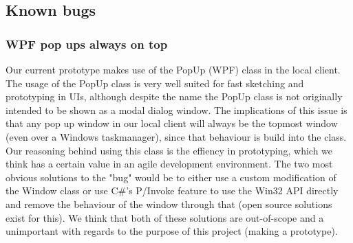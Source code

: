 \subsection{Known bugs}
\label{sec:bugs}

\subsubsection{WPF pop ups always on top}
Our current prototype makes use of the PopUp (WPF) class in the local client. The usage of the PopUp class is very well suited for fast sketching and prototyping in UIs, although despite the name the PopUp class is not originally intended to be shown as a modal dialog window. The implications of this issue is that any pop up window in our local client will always be the topmost window (even over a Windows taskmanager), since that behaviour is build into the class. Our reasoning behind using this class is the effiency in prototyping, which we think has a certain value in an agile development environment. The two most obvious solutions to the "bug" would be to either use a custom modification of the Window class or use C\#'s P/Invoke feature to use the Win32 API directly and remove the behaviour of the window through that (open source solutions exist for this). We think that both of these solutions are out-of-scope and a unimportant with regards to the purpose of this project (making a prototype).